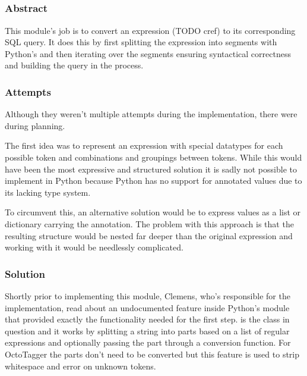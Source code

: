 \subsection{}
\def\kapitelautor{Clemens Stadlbauer}

\subsubsection{Abstract}

This module's job is to convert an expression (TODO cref) to its corresponding
SQL query. It does this by first splitting the expression into segments with
Python's  and then iterating over the segments ensuring
syntactical correctness and building the query in the process.

\subsubsection{Attempts}

Although they weren't multiple attempts during the implementation, there were
during planning.

The first idea was to represent an expression with special datatypes for each
possible token and combinations and groupings between tokens. While this would
have been the most expressive and structured solution it is sadly not possible
to implement in Python because Python has no support for annotated values due
to its lacking type system.

To circumvent this, an alternative solution would be to express values as a
list or dictionary carrying the annotation. The problem with this approach is
that the resulting structure would be nested far deeper than the original
expression and working with it would be needlessly complicated.

\subsubsection{Solution} %

Shortly prior to implementing this module, Clemens, who's responsible for the
implementation, read about an undocumented feature inside Python's 
module that provided exactly the functionality needed for the first step.
 is the class in question and it works by splitting a string
into parts based on a list of regular expressions and optionally passing the
part through a conversion function. For OctoTagger the parts don't need to be
converted but this feature is used to strip whitespace and error on unknown
tokens.

